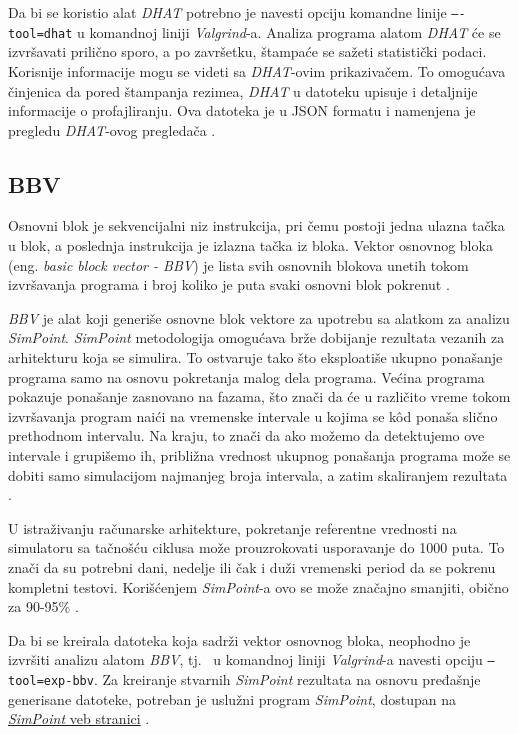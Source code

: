 \documentclass[12pt,oneside]{memoir}
\theoremstyle{plain}
\theoremstyle{definition}
\begin{document}
Da bi se koristio alat \textit{ DHAT} potrebno je navesti opciju komandne linije \texttt{–-tool=dhat} u komandnoj liniji \textit{Valgrind}-a. Analiza programa alatom \textit{DHAT} će se izvršavati prilično sporo, a po završetku, štampaće se sažeti statistički podaci. Korisnije informacije mogu se videti sa \textit{DHAT}-ovim prikazivačem. To omogućava činjenica da pored štampanja rezimea, \textit{DHAT} u datoteku upisuje i detaljnije informacije o profajliranju. Ova datoteka je u JSON formatu i namenjena je pregledu \textit{DHAT}-ovog pregledača \cite{DHAT}. 

\subsection{BBV}

Osnovni blok je sekvencijalni niz instrukcija, pri čemu postoji jedna ulazna tačka u blok, a poslednja instrukcija je izlazna tačka iz bloka. Vektor osnovnog bloka (eng. \textit{basic block vector - BBV}) je lista svih osnovnih blokova unetih tokom izvršavanja programa i broj koliko je puta svaki osnovni blok pokrenut \cite{BBV}. 

\textit{BBV} je alat koji generiše osnovne blok vektore za upotrebu sa alatkom za analizu \textit{SimPoint}. \textit{SimPoint} metodologija omogućava brže dobijanje rezultata vezanih za arhitekturu koja se simulira. To ostvaruje tako što eksploatiše ukupno ponašanje programa samo na osnovu pokretanja malog dela programa. Većina programa pokazuje ponašanje zasnovano na fazama, što znači da će u različito vreme tokom izvršavanja program naići na vremenske intervale u kojima se k\^od ponaša slično prethodnom intervalu. Na kraju, to znači da ako možemo da detektujemo ove intervale i grupišemo ih, približna vrednost ukupnog ponašanja programa može se dobiti samo simulacijom najmanjeg broja intervala, a zatim skaliranjem rezultata \cite{BBV}.

U istraživanju računarske arhitekture, pokretanje referentne vrednosti na simulatoru sa tačnošću ciklusa može prouzrokovati usporavanje do 1000 puta. To znači da su potrebni dani, nedelje ili čak i duži vremenski period da se pokrenu kompletni testovi. Korišćenjem \textit{SimPoint}-a ovo se može značajno smanjiti, obično za 90-95\% \cite{BBV}.

Da bi se kreirala datoteka koja sadrži vektor osnovnog bloka, neophodno je izvršiti analizu alatom \textit{BBV}, tj.~ u komandnoj liniji \textit{Valgrind}-a navesti opciju \texttt{–tool=exp-bbv}. Za kreiranje stvarnih \textit{SimPoint} rezultata na osnovu pređašnje generisane datoteke, potreban je uslužni program \textit{SimPoint}, dostupan na \href{http://cseweb.ucsd.edu/~calder/simpoint/}{\textit{SimPoint} veb stranici} \cite{BBV}.  
\end{document}
